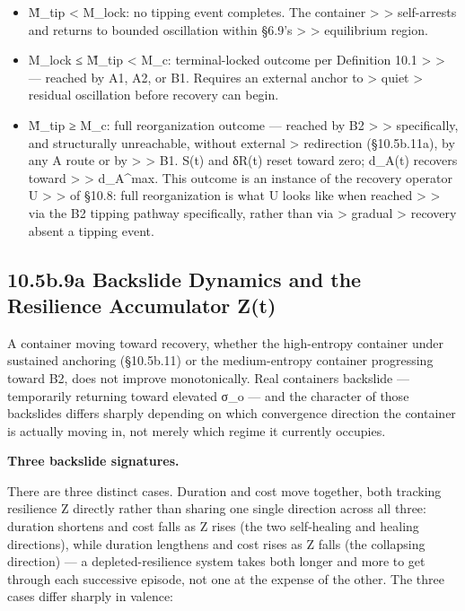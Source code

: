 \documentclass[
]{article}
\begin{document}
\begin{itemize}
\item
  M̃\_tip \textless{} M\_lock: no tipping event completes. The container
  \textgreater{} \textgreater{} self-arrests and returns to bounded
  oscillation within §6.9's \textgreater{} \textgreater{} equilibrium
  region.
\item
  M\_lock ≤ M̃\_tip \textless{} M\_c: terminal-locked outcome per
  Definition 10.1 \textgreater{} \textgreater{} --- reached by A1, A2,
  or B1. Requires an external anchor to \textgreater{} quiet
  \textgreater{} residual oscillation before recovery can begin.
\item
  M̃\_tip ≥ M\_c: full reorganization outcome --- reached by B2
  \textgreater{} \textgreater{} specifically, and structurally
  unreachable, without external \textgreater{} redirection (§10.5b.11a),
  by any A route or by \textgreater{} \textgreater{} B1. S(t) and δR(t)
  reset toward zero; d\_A(t) recovers toward \textgreater{}
  \textgreater{} d\_A\^{}max. This outcome is an instance of the
  recovery operator U \textgreater{} \textgreater{} of §10.8: full
  reorganization is what U looks like when reached \textgreater{}
  \textgreater{} via the B2 tipping pathway specifically, rather than
  via \textgreater{} gradual \textgreater{} recovery absent a tipping
  event.
\end{itemize}

\hypertarget{b.9a-backslide-dynamics-and-the-resilience-accumulator-zt}{%
\subsection{10.5b.9a Backslide Dynamics and the Resilience Accumulator
Z(t)}\label{b.9a-backslide-dynamics-and-the-resilience-accumulator-zt}}

A container moving toward recovery, whether the high-entropy container
under sustained anchoring (§10.5b.11) or the medium-entropy container
progressing toward B2, does not improve monotonically. Real containers
backslide --- temporarily returning toward elevated σ\_o --- and the
character of those backslides differs sharply depending on which
convergence direction the container is actually moving in, not merely
which regime it currently occupies.

\textbf{Three backslide signatures.}

There are three distinct cases. Duration and cost move together, both
tracking resilience Z directly rather than sharing one single direction
across all three: duration shortens and cost falls as Z rises (the two
self-healing and healing directions), while duration lengthens and cost
rises as Z falls (the collapsing direction) --- a depleted-resilience
system takes both longer and more to get through each successive
episode, not one at the expense of the other. The three cases differ
sharply in valence:
\end{document}
